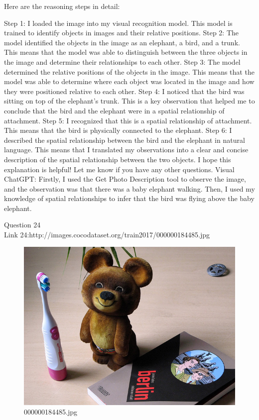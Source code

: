\begin{enumerate}
        Here are the reasoning steps in detail:
        
        Step 1: I loaded the image into my visual recognition model. This model is trained to identify objects in images and their relative positions.
        Step 2: The model identified the objects in the image as an elephant, a bird, and a trunk. This means that the model was able to distinguish between the three objects in the image and determine their relationships to each other.
        Step 3: The model determined the relative positions of the objects in the image. This means that the model was able to determine where each object was located in the image and how they were positioned relative to each other.
        Step 4: I noticed that the bird was sitting on top of the elephant's trunk. This is a key observation that helped me to conclude that the bird and the elephant were in a spatial relationship of attachment.
        Step 5: I recognized that this is a spatial relationship of attachment. This means that the bird is physically connected to the elephant.
        Step 6: I described the spatial relationship between the bird and the elephant in natural language. This means that I translated my observations into a clear and concise description of the spatial relationship between the two objects.
        I hope this explanation is helpful! Let me know if you have any other questions.
        \subitem Visual ChatGPT: Firstly, I used the Get Photo Description tool to observe the image, and the observation was that there was a baby elephant walking. Then, I used my knowledge of spatial relationships to infer that the bird was flying above the baby elephant.
    \end{enumerate}
Question 24\\
Link 24:http://images.cocodataset.org/train2017/000000184485.jpg
    \begin{figure}[h]
        \centering
        \includegraphics[width=0.8\linewidth]{../image set/easy/000000184485.jpg}
        \caption{000000184485.jpg}
    \end{figure}
